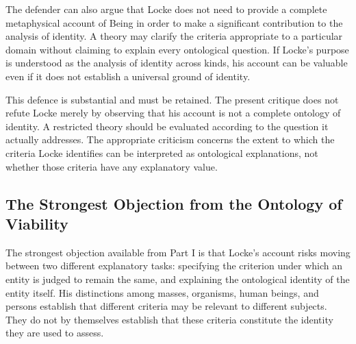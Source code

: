 \label{para:VS.B01.P01.C08.S08.SS11.P004}

The defender can also argue that Locke does
not need to provide a complete metaphysical
account of Being in order to make a significant
contribution to the analysis of identity.
A theory may clarify the criteria appropriate
to a particular domain without claiming to
explain every ontological question. If Locke's
purpose is understood as the analysis of
identity across kinds, his account can be
valuable even if it does not establish a
universal ground of identity.

\label{para:VS.B01.P01.C08.S08.SS11.P005}

This defence is substantial and must be retained.
The present critique does not refute Locke
merely by observing that his account is not
a complete ontology of identity. A restricted
theory should be evaluated according to the
question it actually addresses. The appropriate
criticism concerns the extent to which the
criteria Locke identifies can be interpreted
as ontological explanations, not whether
those criteria have any explanatory value.



\subsection{The Strongest Objection from the Ontology of Viability}
\label{subsec:ch08-locke-objection}

\label{para:VS.B01.P01.C08.S08.SS12.P001}

The strongest objection available from Part I is
that Locke's account risks moving between two
different explanatory tasks: specifying the
criterion under which an entity is judged to
remain the same, and explaining the ontological
identity of the entity itself. His distinctions
among masses, organisms, human beings, and
persons establish that different criteria
may be relevant to different subjects. They
do not by themselves establish that these
criteria constitute the identity they are
used to assess.

\label{para:VS.B01.P01.C08.S08.SS12.P002}

